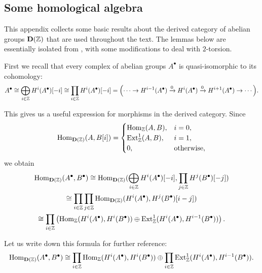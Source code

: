 \documentclass{article}
\numberwithin{equation}{section}
\begin{document}

\pagebreak
\begin{appendices}
\section{Some homological algebra}
\label{app:homological-algebra}

This appendix collects some basic results about the derived category of abelian
groups $\mathbf{D} (\mathbb{Z})$ that are used throughout the text. The lemmas below
are essentially isolated from \cite{Flach-Morin-2018}, with some modifications
to deal with $2$-torsion.

First we recall that every complex of abelian groups $A^\bullet$ is
quasi-isomorphic to its cohomology:
\[ A^\bullet \cong \bigoplus_{i\in \mathbb{Z}} H^i (A^\bullet) [-i] \cong
\prod_{i\in \mathbb{Z}} H^i (A^\bullet) [-i] =
\Bigl(\cdots \to H^{i-1} (A^\bullet) \xrightarrow{0} H^i (A^\bullet) \xrightarrow{0} H^{i+1} (A^\bullet) \to \cdots\Bigr). \]

This gives us a useful expression for morphisms in the derived category.
Since
\[ \operatorname{Hom}_{\mathbf{D} (\mathbb{Z})} (A,B [i]) = \begin{cases}
\operatorname{Hom}_{\mathbb{Z}} (A,B), & i = 0,\\
\operatorname{Ext}_{\mathbb{Z}}^1 (A,B), & i = 1,\\
0, & \text{otherwise},
\end{cases} \]
we obtain
\begin{multline*}
  \operatorname{Hom}_{\mathbf{D} (\mathbb{Z})} (A^\bullet, B^\bullet) \cong
  \operatorname{Hom}_{\mathbf{D} (\mathbb{Z})} (\bigoplus_{i\in\mathbb{Z}} H^i (A^\bullet) [-i], \prod_{j\in\mathbb{Z}} H^j (B^\bullet) [-j]) \\
  \cong \prod_{i\in \mathbb{Z}} \prod_{j\in \mathbb{Z}} \operatorname{Hom}_{\mathbf{D} (\mathbb{Z})} (H^i (A^\bullet), H^j (B^\bullet) [i-j]) \\
  \cong \prod_{i\in \mathbb{Z}} \left(\operatorname{Hom}_{\mathbb{Z}} (H^i (A^\bullet), H^i (B^\bullet)) \oplus \operatorname{Ext}_{\mathbb{Z}}^1 (H^i (A^\bullet), H^{i-1} (B^\bullet))\right).
\end{multline*}

Let us write down this formula for further reference:
\begin{equation}
  \label{eqn:morphisms-in-D(Z)}
  \operatorname{Hom}_{\mathbf{D} (\mathbb{Z})} (A^\bullet, B^\bullet) \cong
  \prod_{i\in \mathbb{Z}} \operatorname{Hom}_{\mathbb{Z}} (H^i (A^\bullet), H^i (B^\bullet)) \oplus
  \prod_{i\in \mathbb{Z}} \operatorname{Ext}_{\mathbb{Z}}^1 (H^i (A^\bullet), H^{i-1} (B^\bullet)).
\end{equation}


\end{appendices}
\end{document}
